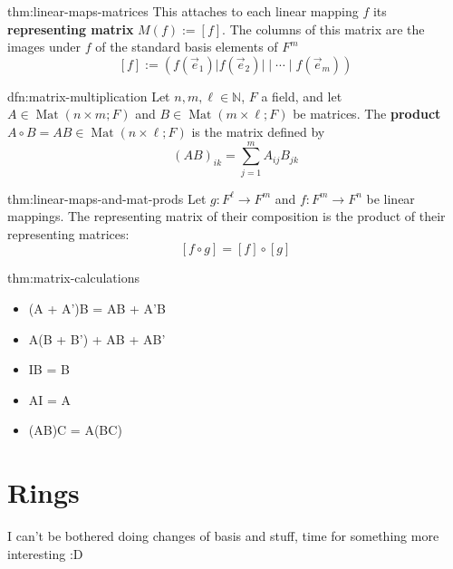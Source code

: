 \documentclass[landscape, 8pt]{extarticle}
\DeclareMathOperator{\Mat}{Mat}
\begin{document}
\begin{multicols}{3}
\begin{thm}{thm:linear-maps-matrices}{}
    This attaches to each linear mapping $f$ its \textbf{representing matrix} $M(f) := [f]$. The columns of this matrix are the images under $f$ of the standard basis elements of $F^{m}$
    \[[f] := (f(\vec{e}_{1}) \lvert f(\vec{e}_{2}) \rvert \mid \cdots \mid f(\vec{e}_{m}))\]
\end{thm}


\begin{dfn}{dfn:matrix-multiplication}{}
    Let $n,m,\ell\in\mathbb{N}$, $F$ a field, and let $A\in \Mat(n \times m; F)$ and $B\in \Mat(m \times \ell; F)$ be matrices. The \textbf{product} $A \circ B = AB\in \Mat(n \times \ell;F)$ is the matrix defined by
    \[(AB)_{ik} = \sum_{j = 1}^{m} A_{ij}B_{jk}\]
\end{dfn}

\begin{thm}{thm:linear-maps-and-mat-prods}{}
    Let $g : F^{\ell}\to F^{m}$ and $f : F^{m} \to F^{n}$ be linear mappings. The representing matrix of their composition is the product of their representing matrices:
    \[[f \circ g] = [f] \circ [g]\]
    
\end{thm}


\begin{thm}{thm:matrix-calculations}{}
    \vspace{-10pt}
    \begin{multicols}{2}
    \begin{itemize}
        \item (A + A')B = AB + A'B
        \item A(B + B') + AB + AB'
        \item IB = B
        \item AI = A
        \item (AB)C = A(BC)
    \end{itemize}
    \end{multicols}
    \vspace{5pt}
\end{thm}

\newpage

\section{Rings}
I can't be bothered doing changes of basis and stuff, time for something more interesting :D 


\end{multicols}
\end{document}
